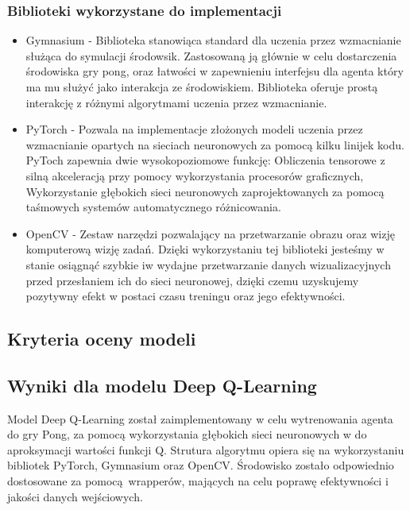 \documentclass[a4paper, 12pt]{article}
\begin{document}
    \subsubsection{Biblioteki wykorzystane do implementacji}
    \begin{itemize}    
        \item Gymnasium - Biblioteka stanowiąca standard dla uczenia przez wzmacnianie służąca do symulacji środowsik. Zastosowaną ją głównie w celu dostarczenia środowiska gry pong, oraz
        łatwości w zapewnieniu interfejsu dla agenta który ma mu służyć jako interakcja ze środowiskiem. Biblioteka oferuje prostą interakcję z różnymi algorytmami uczenia przez wzmacnianie.
        \item PyTorch - Pozwala na implementacje złożonych modeli uczenia przez wzmacnianie opartych na sieciach neuronowych za pomocą kilku linijek kodu. 
        PyToch zapewnia dwie wysokopoziomowe funkcję: Obliczenia tensorowe z silną akceleracją przy pomocy wykorzystania procesorów graficznych, 
        Wykorzystanie głębokich sieci neuronowych zaprojektowanych za pomocą taśmowych systemów automatycznego różnicowania.
        \item OpenCV - Zestaw narzędzi pozwalający na przetwarzanie obrazu oraz wizję komputerową wizję zadań. Dzięki wykorzystaniu tej biblioteki jesteśmy w stanie
        osiągnąć szybkie iw wydajne przetwarzanie danych wizualizacyjnych przed przesłaniem ich do sieci neuronowej, dzięki czemu uzyskujemy 
        pozytywny efekt w postaci czasu treningu oraz jego efektywności. 
    \end{itemize}
    \subsection{Kryteria oceny modeli}
    \subsection{Wyniki dla modelu Deep Q-Learning}
    Model Deep Q-Learning został zaimplementowany w celu wytrenowania agenta do gry Pong, za pomocą
    wykorzystania głębokich sieci neuronowych w do aproksymacji wartości funkcji Q. Strutura algorytmu opiera się na wykorzystaniu
    bibliotek PyTorch, Gymnasium oraz OpenCV. Środowisko zostało odpowiednio dostosowane za pomocą wrapperów, mających na celu poprawę
    efektywności i jakości danych wejściowych. 
    \newpage
\end{document}

